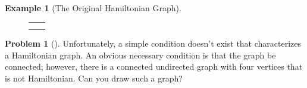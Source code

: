 \documentclass[10pt,]{book}
\theoremstyle{plain}
\theoremstyle{definition}
\theoremstyle{definition}
\theoremstyle{definition}
\newtheorem{example}[theorem]{Example}
\newtheorem{problem}[theorem]{Problem}
\theoremstyle{definition}
\theoremstyle{definition}
\numberwithin{equation}{section}
\newlength{\panelmax}
\begin{document}
\begin{example}[The Original Hamiltonian Graph]
{\setlength{\panelmax}{\maxof{\panelmax}{\phWimage}}
\leavevmode%
\setlength{\tabcolsep}{0\textwidth}
\begin{figure}
\begin{tabular}{@{}*{2}{c}@{}}
\begin{minipage}[c][\panelmax][t]{0.5\textwidth}\usebox{\panelboxVimage}\end{minipage}&
\begin{minipage}[c][\panelmax][t]{0.5\textwidth}\usebox{\panelboxWimage}\end{minipage}\tabularnewline
\parbox[t]{0.5\textwidth}{
}&
\parbox[t]{0.5\textwidth}{
}\end{tabular}
\end{figure}
}%
\end{example}
\begin{problem}[]\label{problem-1}
Unfortunately, a simple condition doesn't exist that characterizes a Hamiltonian graph. An obvious necessary condition is that the
graph be connected; however, there is a connected undirected graph with four vertices that is not Hamiltonian. Can you draw such a graph? 
%
\end{problem}
\end{document}
